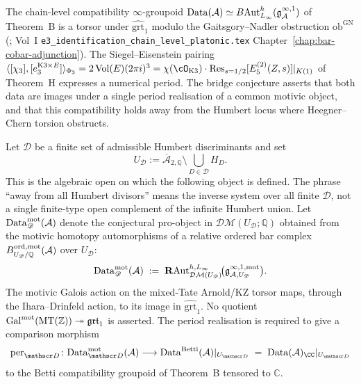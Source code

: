 \providecommand{\BettiRlz}{\mathrm{Betti}}
\providecommand{\HeegObs}{\mathrm{Heeg}}
\providecommand{\Data}{\mathrm{Data}}
\providecommand{\Heeg}{\mathrm{Heeg}}
\providecommand{\MT}{\mathrm{MT}}

The chain-level compatibility $\infty$-groupoid
$\Data(\cA)\simeq B\mathrm{Aut}^h_{L_\infty}(\mathfrak g^{\infty,1}_{\cA})$
of Theorem~B is a torsor under $\widehat{\mathrm{grt}}_1$ modulo the
Gaitsgory--Nadler obstruction $\mathrm{ob}^{\mathrm{GN}}$
(\cite{GaitsgoryNadler09}; Vol~I
\texttt{e3\_identification\_chain\_level\_platonic.tex}
Chapter~\ref{chap:bar-cobar-adjunction}). The Siegel--Eisenstein pairing
$\langle [\chi_3], [e_3^{\mathrm{K3}\times E}]\rangle_{\Phi_3}
= 2\,\mathrm{Vol}(E)(2\pi i)^3
= \chi(\cO_{\mathrm{K3}})\cdot\Res_{s=1/2}[E_5^{(2)}(Z,s)]|_{K(1)}$
of Theorem~H expresses a numerical period. The bridge conjecture asserts
that both data are images under a single period realisation of a common
motivic object, and that this compatibility holds away from the Humbert
locus where Heegner--Chern torsion obstructs.

\begin{definition}
\label{def:motivic-data-groupoid}
Let $\mathscr D$ be a finite set of admissible Humbert discriminants
and set
\[
 U_{\mathscr D}
 :=
 \overline{\mathcal A}_{2,\mathbb Q}
 \setminus \bigcup_{D\in\mathscr D} H_D .
\]
This is the algebraic open on which the following object is defined.
The phrase ``away from all Humbert divisors'' means the inverse system
over all finite $\mathscr D$, not a single finite-type open complement
of the infinite Humbert union. Let
$\Data^{\mot}_{\mathscr D}(\cA)$ denote the conjectural pro-object in
$\mathcal{DM}(U_{\mathscr D};\mathbb Q)$ obtained from the motivic
homotopy automorphisms of a relative ordered bar complex
$B_{U_{\mathscr D}/\mathbb Q}^{\mathrm{ord},\mathrm{mot}}(\mathcal{A})$ over
$U_{\mathscr D}$:
\[
 \Data^{\mot}_{\mathscr D}(\cA)
 \;:=\;
 \mathbf{R}\mathrm{Aut}_{\mathcal{DM}(U_{\mathscr D})}^{h,L_\infty}\!
 \bigl(\mathfrak g^{\infty,1,\mot}_{\cA,U_{\mathscr D}}\bigr).
\]
The motivic Galois action on the mixed-Tate Arnold/KZ torsor maps,
through the Ihara--Drinfeld action, to its image in
$\widehat{\mathrm{grt}}_1$. No quotient
$\mathrm{Gal}^{\mot}(\MT(\mathbb Z))\twoheadrightarrow\grt$ is asserted.
The period realisation is required to give a comparison morphism
\[
 \per_{\mathscr D}\colon \Data^{\mot}_{\mathscr D}(\cA)
 \longrightarrow
 \Data^{\BettiRlz}(\cA)|_{U_{\mathscr D}}
 \;=\; \Data(\cA)_{\CC}|_{U_{\mathscr D}}
\]
to the Betti compatibility groupoid of Theorem~B tensored to
$\mathbb C$.
\end{definition}

